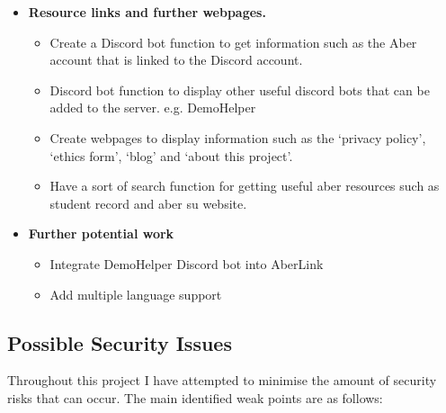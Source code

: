 \begin{itemize}
	\item \textbf{Resource links and further webpages.} 
	\begin{itemize}
		\item Create a Discord bot function to get information such as the Aber account that is linked to the Discord account.
		\item Discord bot function to display other useful discord bots that can be added to the server. e.g. DemoHelper \cite {demohelper}
		\item Create webpages to display information such as the `privacy policy', `ethics form', `blog' and `about this project'.
		\item Have a sort of search function for getting useful aber resources such as student record and aber su website.
	\end{itemize}
	
	\item \textbf{Further potential work}
	\begin{itemize}
		\item Integrate DemoHelper Discord bot into AberLink
		\item Add multiple language support
	\end{itemize}
\end{itemize}

\subsection{Possible Security Issues}
Throughout this project I have attempted to minimise the amount of security risks that can occur. The main identified weak points are as follows:

